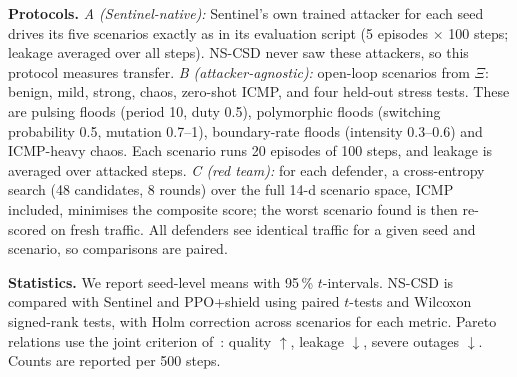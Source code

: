 \textbf{Protocols.} \emph{A (Sentinel-native):} Sentinel's own trained
attacker for each seed drives its five scenarios exactly as in its evaluation
script (5 episodes $\times$ 100 steps; leakage averaged over all steps).
NS-CSD never saw these attackers, so this protocol measures transfer.
\emph{B (attacker-agnostic):} open-loop scenarios from $\Xi$: benign, mild,
strong, chaos, zero-shot ICMP, and four held-out stress tests. These are
pulsing floods (period 10, duty 0.5), polymorphic floods (switching
probability 0.5, mutation 0.7--1), boundary-rate floods (intensity 0.3--0.6)
and ICMP-heavy chaos. Each scenario runs 20 episodes of 100 steps, and
leakage is averaged over attacked steps. \emph{C (red team):} for each
defender, a cross-entropy search (48 candidates, 8 rounds) over the full 14-d
scenario space, ICMP included, minimises the composite score; the worst
scenario found is then re-scored on fresh traffic. All defenders see
identical traffic for a given seed and scenario, so comparisons are paired.

\textbf{Statistics.} We report seed-level means with 95\,\% $t$-intervals.
NS-CSD is compared with Sentinel and PPO+shield using paired $t$-tests and
Wilcoxon signed-rank tests, with Holm correction across scenarios for each
metric. Pareto relations use the joint criterion of~\cite{alfatemi2026sentinel}:
quality $\uparrow$, leakage $\downarrow$, severe outages $\downarrow$. Counts are
reported per 500 steps.
